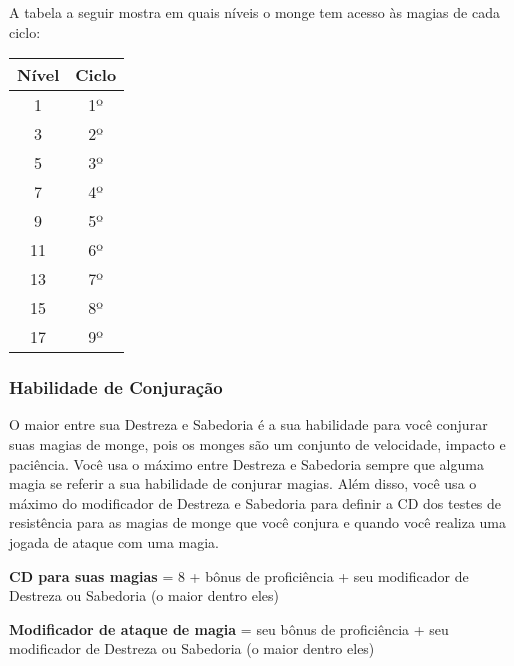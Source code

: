 \begin{multicols}{2}
A tabela a seguir mostra em quais níveis o monge tem acesso às magias de cada
ciclo:

\begin{center}
\begin{tabular}{|||c||c|||}
    \hline
    \textbf{Nível} & \textbf{Ciclo} \\
    \hline
    1 & 1º \\
    \hline
    3 & 2º \\
    \hline
    5 & 3º \\
    \hline
    7 & 4º \\
    \hline
    9 & 5º \\
    \hline
    11 & 6º \\
    \hline
    13 & 7º \\
    \hline
    15 & 8º \\
    \hline
    17 & 9º \\
    \hline
\end{tabular}
\end{center}

\subsubsection*{Habilidade de Conjuração}%

O maior entre sua Destreza e Sabedoria é a sua habilidade para você conjurar
suas magias de monge, pois os monges são um conjunto de velocidade, impacto e
paciência. Você usa o máximo entre Destreza e Sabedoria sempre que alguma magia
se referir a sua habilidade de conjurar magias. Além disso, você usa o máximo do
modificador de Destreza e Sabedoria para definir a CD dos testes de resistência
para as magias de monge que você conjura e quando você realiza uma jogada de
ataque com uma magia.

\begin{center}
\textbf{CD para suas magias} = 8 + bônus de proficiência + seu modificador de
Destreza ou Sabedoria (o maior dentro eles) \nl

\textbf{Modificador de ataque de magia} = seu bônus de proficiência + seu
modificador de Destreza ou Sabedoria (o maior dentro eles)
\end{center}

\end{multicols}
